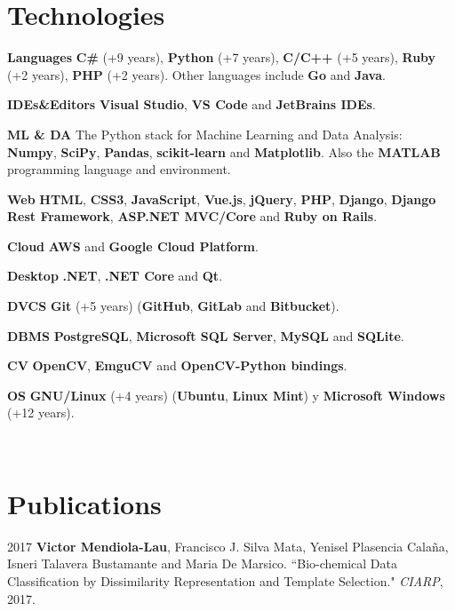 \documentclass[]{friggeri-cv}
\begin{document}
\pagebreak

\section{Technologies}
\begin{entrylist}
  \entry
    {\textbf{Languages}}
    {}
    {}
    {\textbf{C\#} (+9 years), \textbf{Python} (+7 years), \textbf{C/C++} (+5 years), \textbf{Ruby} (+2 years), \textbf{PHP} (+2 years). Other languages include \textbf{Go} and \textbf{Java}.}

  \entry
    {\textbf{IDEs\&Editors}}
    {}
    {}
    {\textbf{Visual Studio}, \textbf{VS Code} and \textbf{JetBrains IDEs}.}
    
  \entry
    {\textbf{ML \& DA}}
    {}
    {}
    {The Python stack for Machine Learning and Data Analysis: \textbf{Numpy}, \textbf{SciPy}, \textbf{Pandas}, \textbf{scikit-learn} and \textbf{Matplotlib}. Also the \textbf{MATLAB} programming language and environment.}

  \entry
    {\textbf{Web}}
    {}
    {}
    {\textbf{HTML}, \textbf{CSS3}, \textbf{JavaScript}, \textbf{Vue.js}, \textbf{jQuery}, \textbf{PHP}, \textbf{Django}, \textbf{Django Rest Framework}, \textbf{ASP.NET MVC/Core} and \textbf{Ruby on Rails}.}

  \entry
    {\textbf{Cloud}}
    {}
    {}
    {\textbf{AWS} and \textbf{Google Cloud Platform}.}

  \entry
    {\textbf{Desktop}}
    {}
    {}
    {\textbf{.NET}, \textbf{.NET Core} and \textbf{Qt}.}    
    
\end{entrylist}

\begin{entrylist}
  \entry
    {\textbf{DVCS}}
    {}
    {}
    {\textbf{Git} (+5 years) (\textbf{GitHub}, \textbf{GitLab} and \textbf{Bitbucket}).}
    
  \entry
    {\textbf{DBMS}}
    {}
    {}
    {\textbf{PostgreSQL}, \textbf{Microsoft SQL Server}, \textbf{MySQL} and \textbf{SQLite}.}
    
  \entry
    {\textbf{CV}}
    {}
    {}
    {\textbf{OpenCV}, \textbf{EmguCV} and \textbf{OpenCV-Python bindings}.}      
    
  \entry
    {\textbf{OS}}
    {}
    {}
    {\textbf{GNU/Linux} (+4 years) (\textbf{Ubuntu}, \textbf{Linux Mint}) y \textbf{Microsoft Windows} (+12 years).}
\end{entrylist}
\\
\section{Publications}
\begin{paperlist}
  \paperentry
    {2017}
    {}
    {}
    {
		\textbf{Victor Mendiola-Lau}, Francisco J. Silva Mata, Yenisel Plasencia Calaña, Isneri Talavera Bustamante and Maria De Marsico. ``Bio-chemical Data Classification by Dissimilarity Representation and Template Selection." \emph{CIARP}, 2017.
    }
\end{paperlist}
\end{document}
